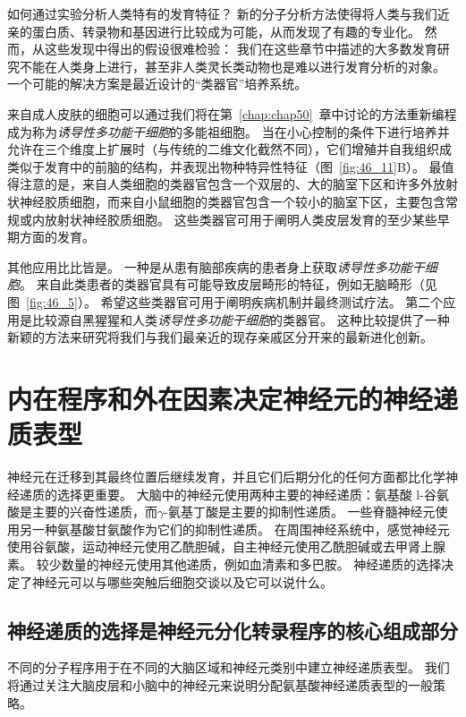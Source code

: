 如何通过实验分析人类特有的发育特征？
新的分子分析方法使得将人类与我们近亲的蛋白质、转录物和基因进行比较成为可能，从而发现了有趣的专业化。
然而，从这些发现中得出的假设很难检验：
我们在这些章节中描述的大多数发育研究不能在人类身上进行，甚至非人类灵长类动物也是难以进行发育分析的对象。
一个可能的解决方案是最近设计的“类器官”培养系统。


来自成人皮肤的细胞可以通过我们将在第~\ref{chap:chap50}~章中讨论的方法重新编程成为称为\textit{诱导性多功能干细胞}的多能祖细胞。
当在小心控制的条件下进行培养并允许在三个维度上扩展时（与传统的二维文化截然不同），它们增殖并自我组织成类似于发育中的前脑的结构，并表现出物种特异性特征（图~\ref{fig:46_11}B）。
最值得注意的是，来自人类细胞的类器官包含一个双层的、大的脑室下区和许多外放射状神经胶质细胞，而来自小鼠细胞的类器官包含一个较小的脑室下区，主要包含常规或内放射状神经胶质细胞。
这些类器官可用于阐明人类皮层发育的至少某些早期方面的发育。


其他应用比比皆是。
一种是从患有脑部疾病的患者身上获取\textit{诱导性多功能干细胞}。
来自此类患者的类器官具有可能导致皮层畸形的特征，例如无脑畸形（见图~\ref{fig:46_5}）。
希望这些类器官可用于阐明疾病机制并最终测试疗法。
第二个应用是比较源自黑猩猩和人类\textit{诱导性多功能干细胞}的类器官。
这种比较提供了一种新颖的方法来研究将我们与我们最亲近的现存亲戚区分开来的最新进化创新。



\section{内在程序和外在因素决定神经元的神经递质表型}

神经元在迁移到其最终位置后继续发育，并且它们后期分化的任何方面都比化学神经递质的选择更重要。
大脑中的神经元使用两种主要的神经递质：氨基酸 l-谷氨酸是主要的兴奋性递质，而$\gamma$-氨基丁酸是主要的抑制性递质。
一些脊髓神经元使用另一种氨基酸甘氨酸作为它们的抑制性递质。
在周围神经系统中，感觉神经元使用谷氨酸，运动神经元使用乙酰胆碱，自主神经元使用乙酰胆碱或去甲肾上腺素。
较少数量的神经元使用其他递质，例如血清素和多巴胺。
神经递质的选择决定了神经元可以与哪些突触后细胞交谈以及它可以说什么。



\subsection{神经递质的选择是神经元分化转录程序的核心组成部分}

不同的分子程序用于在不同的大脑区域和神经元类别中建立神经递质表型。
我们将通过关注大脑皮层和小脑中的神经元来说明分配氨基酸神经递质表型的一般策略。


